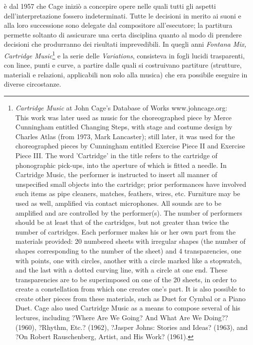 \`e dal 1957 che Cage inizi\`o a concepire opere nelle quali tutti gli aspetti
dell'interpretazione fossero indeterminati. Tutte le decisioni in merito ai
suoni e alla loro successione sono delegate dal compositore all'esecutore;
la partitura permette soltanto di assicurare una certa disciplina quanto al
modo di prendere decisioni che produrranno dei risultati imprevedibili. In quegli
anni \emph{Fontana Mix, Cartridge Music}\footnote{\emph{Cartridge
Music} at John Cage's Database of Works www.johncage.org: \\ This work was later used as music for the choreographed piece by Merce Cunningham
entitled Changing Steps, with stage and costume design by Charles Atlas (from 1973,
Mark Lancaster); still later, it was used for the choreographed pieces by
Cunningham entitled Exercise Piece II and Exercise Piece III.
The word 'Cartridge' in the title refers to the cartridge of phonographic
pick-ups, into the aperture of which is fitted a needle. In Cartridge Music,
the performer is instructed to insert all manner of unspecified small objects
into the cartridge; prior performances have involved such items as pipe cleaners,
matches, feathers, wires, etc. Furniture may be used as well, amplified via
contact microphones. All sounds are to be amplified and are controlled by the
performer(s). The number of performers should be at least that of the cartridges,
but not greater than twice the number of cartridges. Each performer makes his or
her own part from the materials provided: 20 numbered sheets with irregular
shapes (the number of shapes corresponding to the number of the sheet) and 4
transparencies, one with points, one with circles, another with a circle marked
like a stopwatch, and the last with a dotted curving line, with a circle at one
end. These transparencies are to be superimposed on one of the 20 sheets, in
order to create a constellation from which one creates one's part. It is also
possible to create other pieces from these materials, such as Duet for Cymbal
or a Piano Duet. Cage also used Cartridge Music as a means to compose several
of his lectures, including ?Where Are We Going? And What Are We Doing?? (1960),
?Rhythm, Etc.? (1962), ?Jasper Johns: Stories and Ideas? (1963), and
?On Robert Rauschenberg, Artist, and His Work? (1961).} e la serie delle \emph{Variations},
consisteva in fogli lucidi trasparenti, con linee, punti e curve, a partire dalle
quali si costruivano partiture (strutture, materiali e relazioni, applicabili non
solo alla musica) che era possibile eseguire in diverse circostanze.

